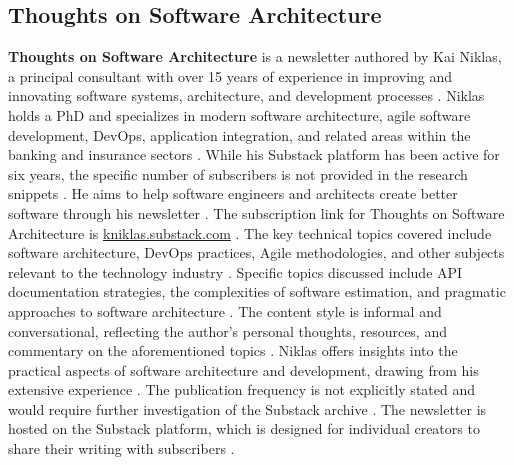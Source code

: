 \documentclass[11pt]{article}
\begin{document}
\subsection{Thoughts on Software Architecture}
\textbf{Thoughts on Software Architecture} is a newsletter authored by Kai Niklas, a principal consultant with over 15 years of experience in improving and innovating software systems, architecture, and development processes \citep{niklas2025substack}. Niklas holds a PhD and specializes in modern software architecture, agile software development, DevOps, application integration, and related areas within the banking and insurance sectors \citep{niklas2025about}. While his Substack platform has been active for six years, the specific number of subscribers is not provided in the research snippets \citep{niklas2025substack}. He aims to help software engineers and architects create better software through his newsletter \citep{niklas2025substack}. The subscription link for Thoughts on Software Architecture is \url{kniklas.substack.com} \citep{niklas2025substack}. The key technical topics covered include software architecture, DevOps practices, Agile methodologies, and other subjects relevant to the technology industry \citep{niklas2025substack}. Specific topics discussed include API documentation strategies, the complexities of software estimation, and pragmatic approaches to software architecture \citep{niklas2025substack}. The content style is informal and conversational, reflecting the author's personal thoughts, resources, and commentary on the aforementioned topics \citep{niklas2025substack}. Niklas offers insights into the practical aspects of software architecture and development, drawing from his extensive experience \citep{niklas2025insights}. The publication frequency is not explicitly stated and would require further investigation of the Substack archive \citep{niklas2025substack}. The newsletter is hosted on the Substack platform, which is designed for individual creators to share their writing with subscribers \citep{niklas2025substack}.
\end{document}
